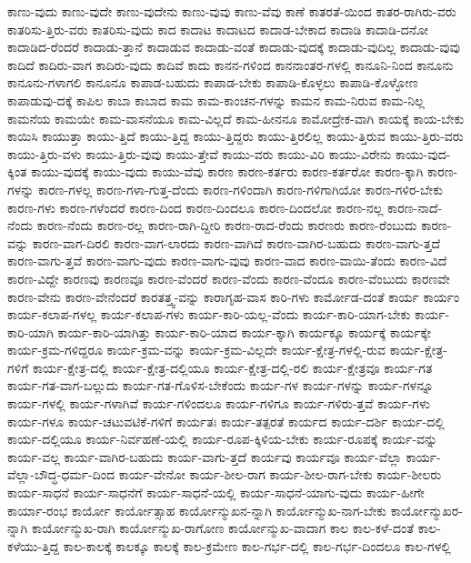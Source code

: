 {ಕಾಣು-ವುದು
ಕಾಣು-ವುದೇ
ಕಾಣು-ವುದೇನು
ಕಾಣು-ವುವು
ಕಾಣು-ವೆವು
ಕಾಣೆ
ಕಾತರತೆ-ಯಿಂದ
ಕಾತರ-ರಾಗಿರು-ವರು
ಕಾತರಿಸು-ತ್ತಿರು-ವರು
ಕಾತರಿಸು-ವುದು
ಕಾದ
ಕಾದಾಟ
ಕಾದಾಟದ
ಕಾದಾಡ-ಬೇಕಾದ
ಕಾದಾಡಿ
ಕಾದಾಡಿ-ದನೋ
ಕಾದಾಡಿದ-ರೆಂದರೆ
ಕಾದಾಡು-ತ್ತಾನೆ
ಕಾದಾಡುವ
ಕಾದಾಡು-ವಂತೆ
ಕಾದಾಡು-ವುದಕ್ಕೆ
ಕಾದಾಡು-ವುದಿಲ್ಲ
ಕಾದಾಡು-ವುವು
ಕಾದಿದೆ
ಕಾದಿರು-ವಾಗ
ಕಾದಿರು-ವುದು
ಕಾದಿವೆ
ಕಾದು
ಕಾನನ-ಗಳಿಂದ
ಕಾನನಾಂತರ-ಗಳಲ್ಲಿ
ಕಾನೂನಿ-ನಿಂದ
ಕಾನೂನು
ಕಾನೂನು-ಗಳಾಗಲಿ
ಕಾನೂನೂ
ಕಾಪಾಡ-ಬಹುದು
ಕಾಪಾಡ-ಬೇಕು
ಕಾಪಾಡಿ-ಕೊಳ್ಳಲು
ಕಾಪಾಡಿ-ಕೊಳ್ಳೋಣ
ಕಾಪಾಡುವು-ದಕ್ಕೆ
ಕಾಪಿಲ
ಕಾಬಾ
ಕಾಬಾದ
ಕಾಮ
ಕಾಮ-ಕಾಂಚನ-ಗಳನ್ನು
ಕಾಮನ
ಕಾಮ-ನಿರುವ
ಕಾಮ-ನಿಲ್ಲ
ಕಾಮನೆಯ
ಕಾಮಯೇ
ಕಾಮ-ವಾಸನೆಯೂ
ಕಾಮ-ವಿಲ್ಲದೆ
ಕಾಮ-ಹೀನನೂ
ಕಾಮೋದ್ರೇಕ-ವಾಗಿ
ಕಾಯಕ್ಕೆ
ಕಾಯ-ಬೇಕು
ಕಾಯಿಸಿ
ಕಾಯುತ್ತಾ
ಕಾಯು-ತ್ತಿದೆ
ಕಾಯು-ತ್ತಿದ್ದ
ಕಾಯು-ತ್ತಿದ್ದರು
ಕಾಯು-ತ್ತಿರಲಿಲ್ಲ
ಕಾಯು-ತ್ತಿರುವ
ಕಾಯು-ತ್ತಿರು-ವರು
ಕಾಯು-ತ್ತಿರು-ವಳು
ಕಾಯು-ತ್ತಿರು-ವುವು
ಕಾಯು-ತ್ತೇವೆ
ಕಾಯು-ವರು
ಕಾಯು-ವಿರಿ
ಕಾಯು-ವಿರೇನು
ಕಾಯು-ವುದ-ಕ್ಕಿಂತ
ಕಾಯು-ವುದಕ್ಕೆ
ಕಾಯು-ವುದು
ಕಾಯು-ವೆವು
ಕಾರಣ
ಕಾರಣ-ಕರ್ತರು
ಕಾರಣ-ಕರ್ತರೋ
ಕಾರಣ-ಕ್ಕಾಗಿ
ಕಾರಣ-ಗಳನ್ನು
ಕಾರಣ-ಗಳಲ್ಲ
ಕಾರಣ-ಗಳಾ-ಗುತ್ತ-ದೆಂದು
ಕಾರಣ-ಗಳಿಂದಾಗಿ
ಕಾರಣ-ಗಳಿಗಾಗಿಯೋ
ಕಾರಣ-ಗಳಿರ-ಬೇಕು
ಕಾರಣ-ಗಳು
ಕಾರಣ-ಗಳೆಂದರೆ
ಕಾರಣ-ದಿಂದ
ಕಾರಣ-ದಿಂದಲೂ
ಕಾರಣ-ದಿಂದಲೋ
ಕಾರಣ-ನಲ್ಲ
ಕಾರಣ-ನಾದೆ-ನೆಂದು
ಕಾರಣ-ನೆಂದು
ಕಾರಣ-ರಲ್ಲ
ಕಾರಣ-ರಾಗಿ-ದ್ದೀರಿ
ಕಾರಣ-ರಾದ-ರೆಂದು
ಕಾರಣರು
ಕಾರಣ-ರೆಂಬುದು
ಕಾರಣ-ವನ್ನು
ಕಾರಣ-ವಾಗ-ದಿರಲಿ
ಕಾರಣ-ವಾಗ-ಲಾರದು
ಕಾರಣ-ವಾಗಿದೆ
ಕಾರಣ-ವಾಗಿರ-ಬಹುದು
ಕಾರಣ-ವಾಗು-ತ್ತದೆ
ಕಾರಣ-ವಾಗು-ತ್ತವೆ
ಕಾರಣ-ವಾಗು-ವುದು
ಕಾರಣ-ವಾಗು-ವುವು
ಕಾರಣ-ವಾದ
ಕಾರಣ-ವಾಯಿ-ತೆಂದು
ಕಾರಣ-ವಿದೆ
ಕಾರಣ-ವಿದ್ದೇ
ಕಾರಣವು
ಕಾರಣವೂ
ಕಾರಣ-ವೆಂದರೆ
ಕಾರಣ-ವೆಂದು
ಕಾರಣ-ವೆಂದೂ
ಕಾರಣ-ವೆಂಬುದು
ಕಾರಣವೇ
ಕಾರಣ-ವೇನು
ಕಾರಣ-ವೇನೆಂದರೆ
ಕಾರತತ್ತ್ವ-ವನ್ನು
ಕಾರಾಗೃಹ-ವಾಸ
ಕಾರಿ-ಗಳು
ಕಾರ್ಮೋಡ-ದಂತೆ
ಕಾರ್ಯ
ಕಾರ್ಯಂ
ಕಾರ್ಯ-ಕಲಾಪ-ಗಳಲ್ಲ
ಕಾರ್ಯ-ಕಲಾಪ-ಗಳು
ಕಾರ್ಯ-ಕಾರಿ-ಯಲ್ಲ-ವೆಂದು
ಕಾರ್ಯ-ಕಾರಿ-ಯಾಗ-ಬೇಕು
ಕಾರ್ಯ-ಕಾರಿ-ಯಾಗಿ
ಕಾರ್ಯ-ಕಾರಿ-ಯಾಗಿತ್ತು
ಕಾರ್ಯ-ಕಾರಿ-ಯಾದ
ಕಾರ್ಯ-ಕ್ಕಾಗಿ
ಕಾರ್ಯಕ್ಕೂ
ಕಾರ್ಯಕ್ಕೆ
ಕಾರ್ಯಕ್ಕೇ
ಕಾರ್ಯ-ಕ್ರಮ-ಗಳಿದ್ದರೂ
ಕಾರ್ಯ-ಕ್ರಮ-ವನ್ನು
ಕಾರ್ಯ-ಕ್ರಮ-ವಿಲ್ಲದೇ
ಕಾರ್ಯ-ಕ್ಷೇತ್ರ-ಗಳಲ್ಲಿ-ರುವ
ಕಾರ್ಯ-ಕ್ಷೇತ್ರ-ಗಳಿಗೆ
ಕಾರ್ಯ-ಕ್ಷೇತ್ರ-ದಲ್ಲಿ
ಕಾರ್ಯ-ಕ್ಷೇತ್ರ-ದಲ್ಲಿಯೂ
ಕಾರ್ಯ-ಕ್ಷೇತ್ರ-ದಲ್ಲಿ-ರಲಿ
ಕಾರ್ಯ-ಕ್ಷೇತ್ರವೂ
ಕಾರ್ಯ-ಗತ
ಕಾರ್ಯ-ಗತ-ವಾಗ-ಬಲ್ಲುದು
ಕಾರ್ಯ-ಗತ-ಗೊಳಿಸ-ಬೇಕೆಂದು
ಕಾರ್ಯ-ಗಳ
ಕಾರ್ಯ-ಗಳನ್ನು
ಕಾರ್ಯ-ಗಳನ್ನೂ
ಕಾರ್ಯ-ಗಳಲ್ಲಿ
ಕಾರ್ಯ-ಗಳಾಗಿವೆ
ಕಾರ್ಯ-ಗಳಿಂದಲೂ
ಕಾರ್ಯ-ಗಳಿಗೂ
ಕಾರ್ಯ-ಗಳಿರು-ತ್ತವೆ
ಕಾರ್ಯ-ಗಳು
ಕಾರ್ಯ-ಗಳೂ
ಕಾರ್ಯ-ಚಟುವಟಿಕೆ-ಗಳಿಗೆ
ಕಾರ್ಯತಃ
ಕಾರ್ಯ-ತತ್ಪರತೆ
ಕಾರ್ಯದ
ಕಾರ್ಯ-ದರ್ಶಿ
ಕಾರ್ಯ-ದಲ್ಲಿ
ಕಾರ್ಯ-ದಲ್ಲಿಯೂ
ಕಾರ್ಯ-ನಿರ್ವಹಣೆ-ಯಲ್ಲಿ
ಕಾರ್ಯ-ರೂಪ-ಕ್ಕಿಳಿಯ-ಬೇಕು
ಕಾರ್ಯ-ರೂಪಕ್ಕೆ
ಕಾರ್ಯ-ವನ್ನು
ಕಾರ್ಯ-ವಲ್ಲ
ಕಾರ್ಯ-ವಾಗಿರ-ಬಹುದು
ಕಾರ್ಯ-ವಾಗು-ತ್ತದೆ
ಕಾರ್ಯವು
ಕಾರ್ಯವೂ
ಕಾರ್ಯ-ವೆಲ್ಲಾ
ಕಾರ್ಯ-ವೆಲ್ಲಾ-ಬೌದ್ಧ-ಧರ್ಮ-ದಿಂದ
ಕಾರ್ಯ-ವೇನೋ
ಕಾರ್ಯ-ಶೀಲ-ರಾಗ
ಕಾರ್ಯ-ಶೀಲ-ರಾಗ-ಬೇಕು
ಕಾರ್ಯ-ಶೀಲರು
ಕಾರ್ಯ-ಸಾಧನೆ
ಕಾರ್ಯ-ಸಾಧನೆಗೆ
ಕಾರ್ಯ-ಸಾಧನೆ-ಯಲ್ಲಿ
ಕಾರ್ಯ-ಸಾಧನೆ-ಯಾಗು-ವುದು
ಕಾರ್ಯ-ಹೀಗೇ
ಕಾರ್ಯಾ-ರಂಭ
ಕಾರ್ಯೋ
ಕಾರ್ಯೋತ್ಸಾಹ
ಕಾರ್ಯೋನ್ಮುಖನ-ನ್ನಾಗಿ
ಕಾರ್ಯೋನ್ಮುಖ-ನಾಗ-ಬೇಕು
ಕಾರ್ಯೋನ್ಮುಖರ-ನ್ನಾಗಿ
ಕಾರ್ಯೋನ್ಮುಖ-ರಾಗಿ
ಕಾರ್ಯೋನ್ಮುಖ-ರಾಗೋಣ
ಕಾರ್ಯೋನ್ಮುಖ-ವಾದಾಗ
ಕಾಲ
ಕಾಲ-ಕಳೆ-ದಂತೆ
ಕಾಲ-ಕಳೆಯು-ತ್ತಿದ್ದ
ಕಾಲ-ಕಾಲಕ್ಕೆ
ಕಾಲಕ್ಕೂ
ಕಾಲಕ್ಕೆ
ಕಾಲ-ಕ್ರಮೇಣ
ಕಾಲ-ಗರ್ಭ-ದಲ್ಲಿ
ಕಾಲ-ಗರ್ಭ-ದಿಂದಲೂ
ಕಾಲ-ಗಳಲ್ಲಿ
}
